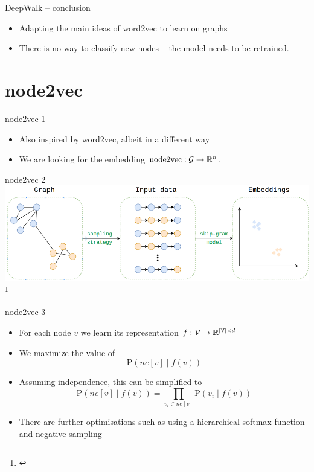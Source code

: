 \documentclass[10pt]{beamer}
\newcommand{\mathspace}{\ensuremath{\mathcal}}
\newcommand{\mathfield}{\ensuremath{\mathbb}}
\begin{document}
\begin{frame}{DeepWalk -- conclusion}
	\begin{itemize}
		\item Adapting the main ideas of word2vec to learn on graphs
		\item There is no way to classify new nodes -- the model needs to be retrained.
	\end{itemize}
\end{frame}

\section{node2vec}

\begin{frame}{node2vec 1}
	\begin{itemize}
		\item Also inspired by word2vec, albeit in a different way
		\item We are looking for the embedding \( \mathrm{node2vec} : \mathspace{G} \to \mathfield{R}^n \).
	\end{itemize}
\end{frame}

\begin{frame}{node2vec 2}
	\centering
	\includegraphics[width=0.9\pagewidth]{images/node2vec.png}\footnote{\cite{cohen_node2vec_2018}}
\end{frame}

\begin{frame}{node2vec 3}
	\begin{itemize}
		\item For each node \( v \) we learn its representation \( f : \mathspace{V} \to \mathfield{R}^{\left\lvert \mathfield{V} \right\rvert \times d} \)
		\item We maximize the value of
			\[ \mathrm{P} \left( ne \left[ v \right] \middle| f \left( v \right) \right) \]
		\item Assuming independence, this can be simplified to
			\[ \mathrm{P} \left( ne \left[ v \right] \middle| f \left( v \right) \right) = \prod_{v_i \in ne \left[ v \right]} \mathrm{P} \left( v_i \middle| f \left( v \right) \right) \]
		\item There are further optimisations such as using a hierarchical softmax function and negative sampling
	\end{itemize}
\end{frame}
\end{document}
